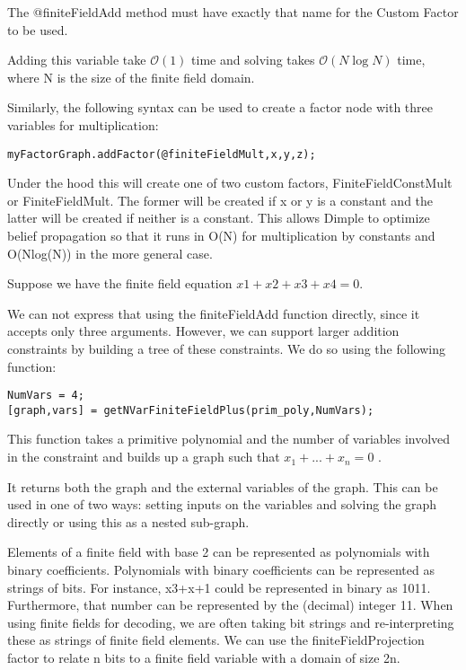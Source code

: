 The @finiteFieldAdd method must have exactly that name for the Custom Factor to be used.

Adding this variable take $\mathcal{O}(1)$ time and solving takes $\mathcal{O}(N\log N)$ time, where N is the size of the finite field domain.


Similarly, the following syntax can be used to create a factor node with three variables for multiplication:

\begin{lstlisting}
myFactorGraph.addFactor(@finiteFieldMult,x,y,z);
\end{lstlisting}

Under the hood this will create one of two custom factors, FiniteFieldConstMult or FiniteFieldMult. The former will be created if x or y is a constant and the latter will be created if neither is a constant. This allows Dimple to optimize belief propagation so that it runs in O(N) for multiplication by constants and O(Nlog(N)) in the more general case.


Suppose we have the finite field equation $ x1+x2+x3+x4=0 $.

We can not express that using the finiteFieldAdd function directly, since it accepts only three arguments. However, we can support larger addition constraints by building a tree of these constraints. We do so using the following function:

\begin{lstlisting}
NumVars = 4;
[graph,vars] = getNVarFiniteFieldPlus(prim_poly,NumVars);
\end{lstlisting}

This function takes a primitive polynomial and the number of variables involved in the constraint and builds up a graph such that  $ x_1+...+x_n = 0 $ .

It returns both the graph and the external variables of the graph. This can be used in one of two ways: setting inputs on the variables and solving the graph directly or using this as a nested sub-graph.


Elements of a finite field with base 2 can be represented as polynomials with binary coefficients. Polynomials with binary coefficients can be represented as strings of bits. For instance, x3+x+1 could be represented in binary as 1011. Furthermore, that number can be represented by the (decimal) integer 11. When using finite fields for decoding, we are often taking bit strings and re-interpreting these as strings of finite field elements. We can use the finiteFieldProjection factor to relate n bits to a finite field variable with a domain of size 2n.

